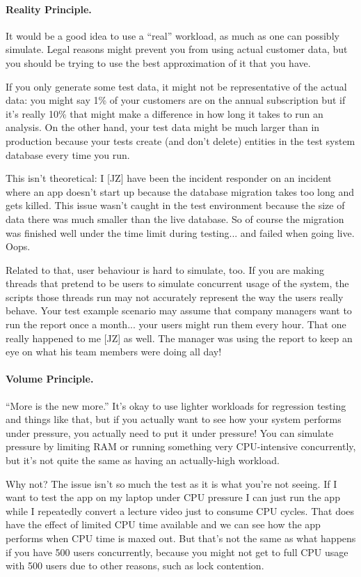 \paragraph{Reality Principle.}
It would be a good idea to use a ``real'' workload, as much as one can possibly simulate. Legal reasons might prevent you from using actual customer data, but you should be trying to use the best approximation of it that you have. 

If you only generate some test data, it might not be representative of the actual data: you might say 1\% of your customers are on the annual subscription but if it's really 10\% that might make a difference in how long it takes to run an analysis. On the other hand, your test data might be much larger than in production because your tests create (and don't delete) entities in the test system database every time you run.

This isn't theoretical: I [JZ] have been the incident responder on an incident where an app doesn't start up because the database migration takes too long and gets killed. This issue wasn't caught in the test environment because the size of data there was much smaller than the live database. So of course the migration was finished well under the time limit during testing... and failed when going live. Oops.

Related to that, user behaviour is hard to simulate, too. If you are making threads that pretend to be users to simulate concurrent usage of the system, the scripts those threads run may not accurately represent the way the users really behave.  Your test example scenario may assume that company managers want to run the report once a month... your users might run them every hour. That one really happened to me [JZ] as well. The manager was using the report to keep an eye on what his team members were doing all day!

\paragraph{Volume Principle.}
``More is the new more.'' It's okay to use lighter workloads for regression testing and things like that, but if you actually want to see how your system performs under pressure, you actually need to put it under pressure! You can simulate pressure by limiting RAM or running something very CPU-intensive concurrently, but it's not quite the same as having an actually-high workload. 

Why not? The issue isn't so much the test as it is what you're not seeing. If I want to test the app on my laptop under CPU pressure I can just run the app while I repeatedly convert a lecture video just to consume CPU cycles. That does have the effect of limited CPU time available and we can see how the app performs when CPU time is maxed out. But that's not the same as what happens if you have 500 users concurrently, because you might not get to full CPU usage with 500 users due to other reasons, such as lock contention. 

